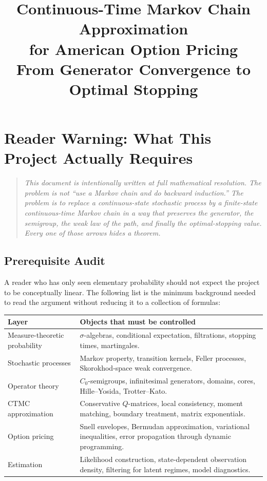 \documentclass[11pt,a4paper,openany]{book}
\title{\Huge Continuous-Time Markov Chain Approximation\\[4pt] for American Option Pricing\\[12pt]
\large From Generator Convergence to Optimal Stopping}
\author{}
\date{}
\theoremstyle{definition}
\theoremstyle{plain}
\theoremstyle{remark}
\newcommand{\1}{\mathbbm{1}}
\begin{document}
\maketitle

\setcounter{tocdepth}{1}
\tableofcontents

\chapter*{Reader Warning: What This Project Actually Requires}

\begin{quote}
\itshape This document is intentionally written at full mathematical resolution. The problem is not ``use a Markov chain and do backward induction.'' The problem is to replace a continuous-state stochastic process by a finite-state continuous-time Markov chain in a way that preserves the generator, the semigroup, the weak law of the path, and finally the optimal-stopping value. Every one of those arrows hides a theorem.
\end{quote}

\section*{Prerequisite Audit}

A reader who has only seen elementary probability should not expect the project to be conceptually linear. The following list is the minimum background needed to read the argument without reducing it to a collection of formulas:

\begin{center}
\begin{tabular}{>{\raggedright\arraybackslash}p{4cm}>{\raggedright\arraybackslash}p{8.5cm}}
\toprule
\textbf{Layer} & \textbf{Objects that must be controlled} \\
\midrule
Measure-theoretic probability & $\sigma$-algebras, conditional expectation, filtrations, stopping times, martingales. \\
Stochastic processes & Markov property, transition kernels, Feller processes, Skorokhod-space weak convergence. \\
Operator theory & $C_0$-semigroups, infinitesimal generators, domains, cores, Hille--Yosida, Trotter--Kato. \\
CTMC approximation & Conservative $Q$-matrices, local consistency, moment matching, boundary treatment, matrix exponentials. \\
Option pricing & Snell envelopes, Bermudan approximation, variational inequalities, error propagation through dynamic programming. \\
Estimation & Likelihood construction, state-dependent observation density, filtering for latent regimes, model diagnostics. \\
\bottomrule
\end{tabular}
\end{center}
\end{document}
